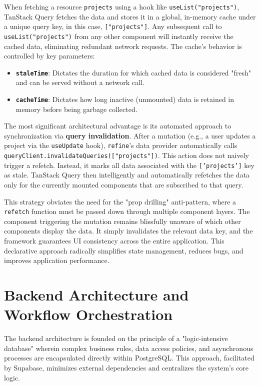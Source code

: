 When fetching a resource \texttt{projects} using a hook like \texttt{useList("projects")}, TanStack Query fetches the data and stores it in a global, in-memory cache under a unique query key, in this case, \texttt{["projects"]}. Any subsequent call to \texttt{useList("projects")} from any other component will instantly receive the cached data, eliminating redundant network requests. The cache's behavior is controlled by key parameters:
\begin{itemize}
    \item \textbf{\texttt{staleTime}}: Dictates the duration for which cached data is considered "fresh" and can be served without a network call.
    \item \textbf{\texttt{cacheTime}}: Dictates how long inactive (unmounted) data is retained in memory before being garbage collected.
\end{itemize}
The most significant architectural advantage is its automated approach to synchronization via \textbf{query invalidation}. After a mutation (e.g., a user updates a project via the \texttt{useUpdate} hook), \texttt{refine}'s data provider automatically calls \texttt{queryClient.invalidateQueries(["projects"])}. This action does not naively trigger a refetch. Instead, it marks all data associated with the \texttt{['projects']} key as stale. TanStack Query then intelligently and automatically refetches the data only for the currently mounted components that are subscribed to that query.

This strategy obviates the need for the "prop drilling" anti-pattern, where a \texttt{refetch} function must be passed down through multiple component layers. The component triggering the mutation remains blissfully unaware of which other components display the data. It simply invalidates the relevant data key, and the framework guarantees UI consistency across the entire application. This declarative approach radically simplifies state management, reduces bugs, and improves application performance.





\section{Backend Architecture and Workflow Orchestration}
\label{sec:backend_architecture}

The backend architecture is founded on the principle of a "logic-intensive database" wherein complex business rules, data access policies, and asynchronous processes are encapsulated directly within PostgreSQL. This approach, facilitated by Supabase, minimizes external dependencies and centralizes the system's core logic.

